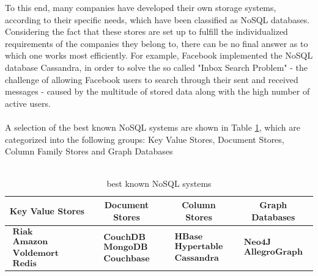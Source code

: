 To this end, many companies have developed their own storage systems, according to their specific needs, which have been classified as \ac{NoSQL} databases. Considering the fact that these stores are set up to fulfill the individualized requirements of the companies they belong to, there can be no final answer as to which one works most efficiently. For example, Facebook implemented the \ac{NoSQL} database Cassandra, in order to solve the so called "Inbox Search Problem" - the challenge of allowing Facebook users to search through their sent and received messages - caused by the multitude of stored data along with the high number of active users. 
\\
\\
A selection of the best known \ac{NoSQL} systems are shown in Table \ref{tbl:nosql_sys}, which are categorized into the following groups: Key Value Stores, Document Stores, Column Family Stores and  Graph Databases
\\
\\
\begin{table}[htb]
\begin{tabular}{|c|c|c|c|}
\hline 
\textbf{Key Value Stores} & \textbf{Document Stores} & \textbf{Column Stores} & \textbf{Graph Databases} \\ 
\hline 
$\begin{array}{l} \textbf{Riak} \\ \textbf{Amazon SimpleDB} \\ \textbf{Voldemort}\\  \textbf{Redis} \end{array}$ & 
$\begin{array}{l} \textbf{CouchDB} \\ \textbf{MongoDB} \\ \textbf{Couchbase} \end{array}$ & 
$\begin{array}{l} \textbf{HBase} \\ \textbf{Hypertable} \\ \textbf{Cassandra}  \end{array}$  & 
$\begin{array}{l} \textbf{Neo4J} \\ \textbf{AllegroGraph}   \end{array}$ \\ 
\hline 
\end{tabular}
\caption{best known \ac{NoSQL} systems}
\label{tbl:nosql_sys}
\end{table}
\\
\\

